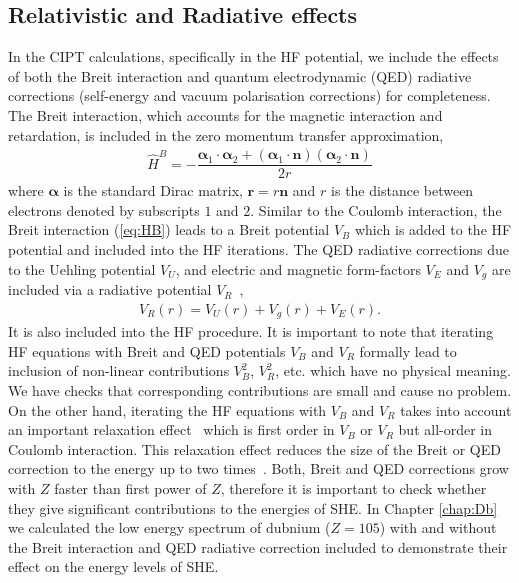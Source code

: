 \documentclass[10pt,a4paper, twoside, openright]{report}
\begin{document}
\subsection{Relativistic and Radiative effects}
In the CIPT calculations, specifically in the HF potential, we include the effects of both the Breit interaction \cite{Breit1929, Mann1971} and quantum electrodynamic (QED) radiative corrections (self-energy and vacuum polarisation corrections) \cite{FG2005} for completeness. The Breit interaction, which accounts for the magnetic interaction and retardation, is included in the zero momentum transfer approximation,
\begin{align}\label{eq:HB}
\hat{H}^B = -\dfrac{\boldsymbol{\alpha}_1 \cdot \boldsymbol{\alpha}_2 + \left(\boldsymbol{\alpha}_1\cdot\textbf{n}\right)\left(\boldsymbol{\alpha}_2\cdot \textbf{n}\right)}{2r}
\end{align}
where $\boldsymbol{\alpha}$ is the standard Dirac matrix, $\textbf{r}=r\textbf{n}$ and $r$ is the distance between electrons denoted by subscripts $1$ and $2$.  Similar to the Coulomb interaction, the Breit interaction (\ref{eq:HB}) leads to a Breit potential $V_B$ which is added to the HF potential and included into the HF iterations. The QED radiative corrections due to the Uehling potential $V_U$, and electric and magnetic form-factors $V_E $ and $ V_g$  are included via a radiative potential $V_R$~\cite{FG2005},
\begin{align}\label{eq:VR}
V_{R}(r) = V_{U}(r) + V_{g}(r) + V_{E}(r).
\end{align}
It is also included into the HF procedure. It is important to note that iterating HF equations with Breit and QED potentials $V_B$ and $V_R$ formally lead to inclusion of non-linear contributions  $V_B^2$, $V_R^2$, etc. which have no physical meaning. We have checks that corresponding contributions are small and cause no problem. On the other hand, iterating the HF equations with $V_B$ and $V_R$ takes into account an important relaxation effect~\cite{DF2016} which is first order in $V_B$ or $V_R$ but all-order in Coulomb interaction. This relaxation effect reduces the size of the Breit or QED correction to the energy up to two times~\cite{DF2016}. Both, Breit and QED corrections grow with $Z$ faster than first power of $Z$, therefore it is important to check whether they give significant contributions to the energies of SHE.  In Chapter \ref{chap:Db} we calculated the low energy spectrum of dubnium ($Z=105$) with and without the Breit interaction and QED radiative correction included to demonstrate their effect on the energy levels of SHE.
\end{document}
